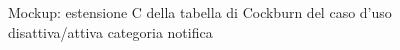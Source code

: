 \begin{figure}[ht]
    \caption{Mockup: estensione C della tabella di Cockburn del caso d'uso disattiva/attiva categoria notifica}
    \label{fig:mockup_estensione_C_disattiva_notifiche}
\end{figure}

\newpage


